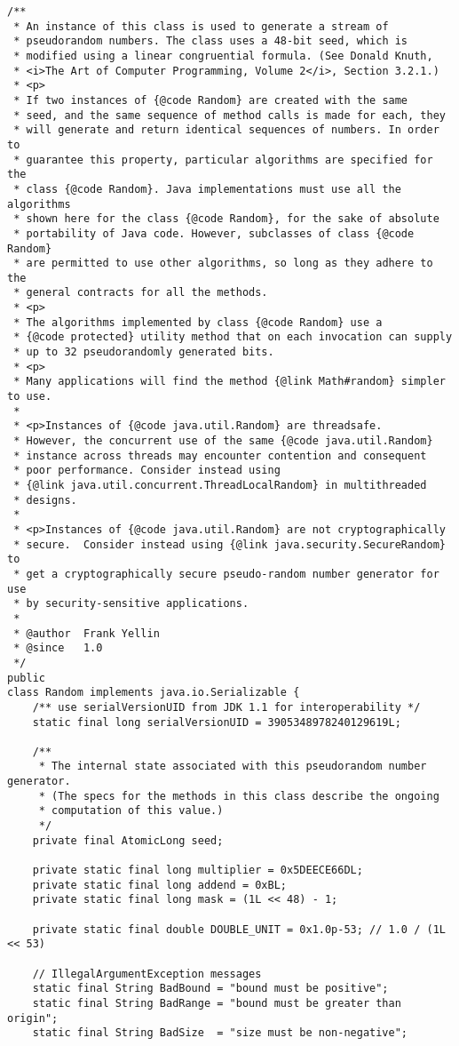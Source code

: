 \documentclass[12pt,a4paper,twoside,openright,titlepage,final]{article}
\begin{document}
\begin{verbatim}
/**
 * An instance of this class is used to generate a stream of
 * pseudorandom numbers. The class uses a 48-bit seed, which is
 * modified using a linear congruential formula. (See Donald Knuth,
 * <i>The Art of Computer Programming, Volume 2</i>, Section 3.2.1.)
 * <p>
 * If two instances of {@code Random} are created with the same
 * seed, and the same sequence of method calls is made for each, they
 * will generate and return identical sequences of numbers. In order to
 * guarantee this property, particular algorithms are specified for the
 * class {@code Random}. Java implementations must use all the algorithms
 * shown here for the class {@code Random}, for the sake of absolute
 * portability of Java code. However, subclasses of class {@code Random}
 * are permitted to use other algorithms, so long as they adhere to the
 * general contracts for all the methods.
 * <p>
 * The algorithms implemented by class {@code Random} use a
 * {@code protected} utility method that on each invocation can supply
 * up to 32 pseudorandomly generated bits.
 * <p>
 * Many applications will find the method {@link Math#random} simpler to use.
 *
 * <p>Instances of {@code java.util.Random} are threadsafe.
 * However, the concurrent use of the same {@code java.util.Random}
 * instance across threads may encounter contention and consequent
 * poor performance. Consider instead using
 * {@link java.util.concurrent.ThreadLocalRandom} in multithreaded
 * designs.
 *
 * <p>Instances of {@code java.util.Random} are not cryptographically
 * secure.  Consider instead using {@link java.security.SecureRandom} to
 * get a cryptographically secure pseudo-random number generator for use
 * by security-sensitive applications.
 *
 * @author  Frank Yellin
 * @since   1.0
 */
public
class Random implements java.io.Serializable {
    /** use serialVersionUID from JDK 1.1 for interoperability */
    static final long serialVersionUID = 3905348978240129619L;

    /**
     * The internal state associated with this pseudorandom number generator.
     * (The specs for the methods in this class describe the ongoing
     * computation of this value.)
     */
    private final AtomicLong seed;

    private static final long multiplier = 0x5DEECE66DL;
    private static final long addend = 0xBL;
    private static final long mask = (1L << 48) - 1;

    private static final double DOUBLE_UNIT = 0x1.0p-53; // 1.0 / (1L << 53)

    // IllegalArgumentException messages
    static final String BadBound = "bound must be positive";
    static final String BadRange = "bound must be greater than origin";
    static final String BadSize  = "size must be non-negative";


\end{verbatim}
\end{document}

